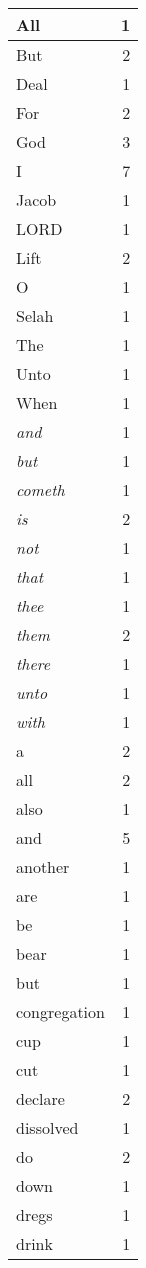 \begin{center}
\begin{longtable}{l|r}
\hline \hline
\endlastfoot
All & 1 \\ \hline
But & 2 \\ \hline
Deal & 1 \\ \hline
For & 2 \\ \hline
God & 3 \\ \hline
I & 7 \\ \hline
Jacob & 1 \\ \hline
LORD & 1 \\ \hline
Lift & 2 \\ \hline
O & 1 \\ \hline
Selah & 1 \\ \hline
The & 1 \\ \hline
Unto & 1 \\ \hline
When & 1 \\ \hline
\emph{and} & 1 \\ \hline
\emph{but} & 1 \\ \hline
\emph{cometh} & 1 \\ \hline
\emph{is} & 2 \\ \hline
\emph{not} & 1 \\ \hline
\emph{that} & 1 \\ \hline
\emph{thee} & 1 \\ \hline
\emph{them} & 2 \\ \hline
\emph{there} & 1 \\ \hline
\emph{unto} & 1 \\ \hline
\emph{with} & 1 \\ \hline
a & 2 \\ \hline
all & 2 \\ \hline
also & 1 \\ \hline
and & 5 \\ \hline
another & 1 \\ \hline
are & 1 \\ \hline
be & 1 \\ \hline
bear & 1 \\ \hline
but & 1 \\ \hline
congregation & 1 \\ \hline
cup & 1 \\ \hline
cut & 1 \\ \hline
declare & 2 \\ \hline
dissolved & 1 \\ \hline
do & 2 \\ \hline
down & 1 \\ \hline
dregs & 1 \\ \hline
drink & 1 \\ \hline

\end{longtable}
\end{center}
